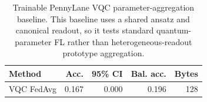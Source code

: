 ﻿\begin{table}[t]
\centering
\caption{Trainable PennyLane VQC parameter-aggregation baseline. This baseline uses a shared ansatz and canonical readout, so it tests standard quantum-parameter FL rather than heterogeneous-readout prototype aggregation.}
\label{tab:quantum-param-vqc}
\begin{tabular}{lrrrr}
\toprule
Method & Acc. & 95\% CI & Bal. acc. & Bytes \\
\midrule
VQC FedAvg & 0.167 & 0.000 & 0.196 & 128 \\
\bottomrule
\end{tabular}
\end{table}

